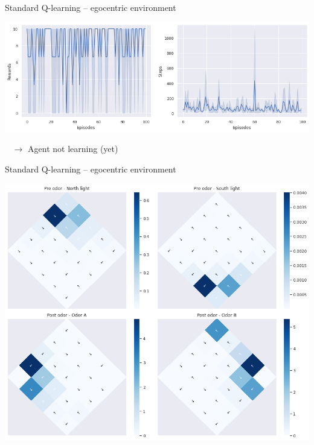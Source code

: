 \documentclass[bigger]{beamer}
\begin{document}
\begin{frame}[label={sec:org5e14e60}]{Standard Q-learning -- egocentric environment}
\begin{center}
\includegraphics[width=.9\linewidth]{img/q-learning_ego_steps_rewards.png}
\end{center}
\begin{block}{~}
\centering
\(\to\) Agent not learning (yet)
\end{block}
\end{frame}
\begin{frame}[label={sec:org9ef76fe}]{Standard Q-learning -- egocentric environment}
\begin{center}
\includegraphics[height=0.9\textheight]{img/q-learning_ego_best_actions_maps.png}
\end{center}
\end{frame}
\end{document}
